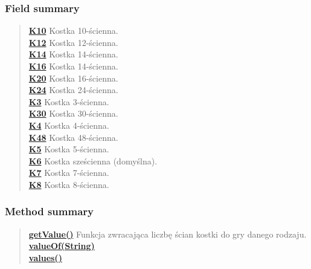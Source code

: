 \documentclass[11pt,a4paper]{article}
\begin{document}
{{{\subsubsection{Field summary}{
\begin{verse}
\hyperlink{com.example.kostkadogry.Kostka.RodzajKostki.K10}{{\bf K10}} Kostka 10-ścienna.\\
\hyperlink{com.example.kostkadogry.Kostka.RodzajKostki.K12}{{\bf K12}} Kostka 12-ścienna.\\
\hyperlink{com.example.kostkadogry.Kostka.RodzajKostki.K14}{{\bf K14}} Kostka 14-ścienna.\\
\hyperlink{com.example.kostkadogry.Kostka.RodzajKostki.K16}{{\bf K16}} Kostka 14-ścienna.\\
\hyperlink{com.example.kostkadogry.Kostka.RodzajKostki.K20}{{\bf K20}} Kostka 16-ścienna.\\
\hyperlink{com.example.kostkadogry.Kostka.RodzajKostki.K24}{{\bf K24}} Kostka 24-ścienna.\\
\hyperlink{com.example.kostkadogry.Kostka.RodzajKostki.K3}{{\bf K3}} Kostka 3-ścienna.\\
\hyperlink{com.example.kostkadogry.Kostka.RodzajKostki.K30}{{\bf K30}} Kostka 30-ścienna.\\
\hyperlink{com.example.kostkadogry.Kostka.RodzajKostki.K4}{{\bf K4}} Kostka 4-ścienna.\\
\hyperlink{com.example.kostkadogry.Kostka.RodzajKostki.K48}{{\bf K48}} Kostka 48-ścienna.\\
\hyperlink{com.example.kostkadogry.Kostka.RodzajKostki.K5}{{\bf K5}} Kostka 5-ścienna.\\
\hyperlink{com.example.kostkadogry.Kostka.RodzajKostki.K6}{{\bf K6}} Kostka sześcienna (domyślna).\\
\hyperlink{com.example.kostkadogry.Kostka.RodzajKostki.K7}{{\bf K7}} Kostka 7-ścienna.\\
\hyperlink{com.example.kostkadogry.Kostka.RodzajKostki.K8}{{\bf K8}} Kostka 8-ścienna.\\
\end{verse}
}
\subsubsection{Method summary}{
\begin{verse}
\hyperlink{com.example.kostkadogry.Kostka.RodzajKostki.getValue()}{{\bf getValue()}} Funkcja zwracająca liczbę ścian kostki do gry danego rodzaju.\\
\hyperlink{com.example.kostkadogry.Kostka.RodzajKostki.valueOf(java.lang.String)}{{\bf valueOf(String)}} \\
\hyperlink{com.example.kostkadogry.Kostka.RodzajKostki.values()}{{\bf values()}} \\
\end{verse}
}
}}}
\end{document}
